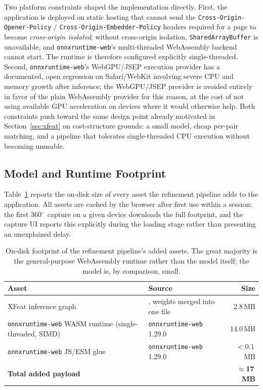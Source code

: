 \documentclass[11pt]{article}
\newcommand{\Deg}{\ensuremath{^{\circ}}}
\begin{document}
Two platform constraints shaped the implementation directly. First, the application is deployed on static hosting that cannot send the \texttt{Cross-Origin-Opener-Policy} / \texttt{Cross-Origin-Embedder-Policy} headers required for a page to become \emph{cross-origin isolated}; without cross-origin isolation, \texttt{SharedArrayBuffer} is unavailable, and \texttt{onnxruntime-web}'s multi-threaded WebAssembly backend cannot start. The runtime is therefore configured explicitly single-threaded. Second, \texttt{onnxruntime-web}'s WebGPU/JSEP execution provider has a documented, open regression on Safari/WebKit involving severe CPU and memory growth after inference; the WebGPU/JSEP provider is avoided entirely in favor of the plain WebAssembly provider for this reason, at the cost of not using available GPU acceleration on devices where it would otherwise help. Both constraints push toward the same design point already motivated in Section~\ref{sec:xfeat} on cost-structure grounds: a small model, cheap per-pair matching, and a pipeline that tolerates single-threaded CPU execution without becoming unusable.

\subsection{Model and Runtime Footprint}

Table~\ref{tab:footprint} reports the on-disk size of every asset the refinement pipeline adds to the application. All assets are cached by the browser after first use within a session; the first 360\Deg\ capture on a given device downloads the full footprint, and the capture UI reports this explicitly during the loading stage rather than presenting an unexplained delay.

\begin{table}[h]
\centering
\small
\begin{tabular}{@{}llr@{}}
\toprule
\textbf{Asset} & \textbf{Source} & \textbf{Size} \\
\midrule
XFeat inference graph & \cite{potje2024xfeat}, weights merged into one file & 2.8\,MB \\
\texttt{onnxruntime-web} WASM runtime (single-threaded, SIMD) & \texttt{onnxruntime-web} 1.29.0 & 14.0\,MB \\
\texttt{onnxruntime-web} JS/ESM glue & \texttt{onnxruntime-web} 1.29.0 & $<$0.1\,MB \\
\midrule
\textbf{Total added payload} & & \textbf{$\approx$17\,MB} \\
\bottomrule
\end{tabular}
\caption{On-disk footprint of the refinement pipeline's added assets. The great majority is the general-purpose WebAssembly runtime rather than the model itself; the model is, by comparison, small.}
\label{tab:footprint}
\end{table}
\end{document}

